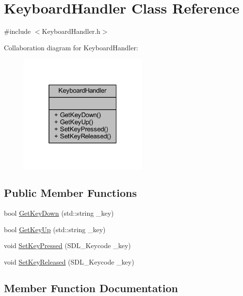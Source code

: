 \hypertarget{class_keyboard_handler}{}\section{Keyboard\+Handler Class Reference}
\label{class_keyboard_handler}


{\ttfamily \#include $<$Keyboard\+Handler.\+h$>$}



Collaboration diagram for Keyboard\+Handler\+:
\nopagebreak
\begin{figure}[H]
\begin{center}
\leavevmode
\includegraphics[width=184pt]{class_keyboard_handler__coll__graph}
\end{center}
\end{figure}
\subsection*{Public Member Functions}
\begin{DoxyCompactItemize}
\item 
bool \mbox{\hyperlink{class_keyboard_handler_accf4e35731010260a4f519c929d00a64}{Get\+Key\+Down}} (std\+::string \+\_\+key)
\item 
bool \mbox{\hyperlink{class_keyboard_handler_ad184d06a6bf5d2d1db362e79a8073d98}{Get\+Key\+Up}} (std\+::string \+\_\+key)
\item 
void \mbox{\hyperlink{class_keyboard_handler_a166c8d62ec7c01cb155e7ba47007501a}{Set\+Key\+Pressed}} (S\+D\+L\+\_\+\+Keycode \+\_\+key)
\item 
void \mbox{\hyperlink{class_keyboard_handler_a696a4ddd0a75c79f220c424bd4bd1889}{Set\+Key\+Released}} (S\+D\+L\+\_\+\+Keycode \+\_\+key)
\end{DoxyCompactItemize}


\subsection{Member Function Documentation}
\mbox{\label{class_keyboard_handler_accf4e35731010260a4f519c929d00a64}} 
